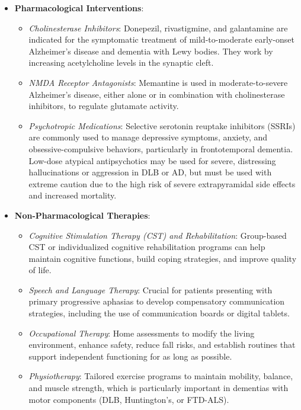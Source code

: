 \begin{itemize}
    \item \textbf{Pharmacological Interventions}:
    \begin{itemize}
        \item \textit{Cholinesterase Inhibitors}: Donepezil, rivastigmine, and galantamine are indicated for the symptomatic treatment of mild-to-moderate early-onset Alzheimer's disease and dementia with Lewy bodies. They work by increasing acetylcholine levels in the synaptic cleft.
        \item \textit{NMDA Receptor Antagonists}: Memantine is used in moderate-to-severe Alzheimer's disease, either alone or in combination with cholinesterase inhibitors, to regulate glutamate activity.
        \item \textit{Psychotropic Medications}: Selective serotonin reuptake inhibitors (SSRIs) are commonly used to manage depressive symptoms, anxiety, and obsessive-compulsive behaviors, particularly in frontotemporal dementia. Low-dose atypical antipsychotics may be used for severe, distressing hallucinations or aggression in DLB or AD, but must be used with extreme caution due to the high risk of severe extrapyramidal side effects and increased mortality.
    \end{itemize}
    \item \textbf{Non-Pharmacological Therapies}:
    \begin{itemize}
        \item \textit{Cognitive Stimulation Therapy (CST) and Rehabilitation}: Group-based CST or individualized cognitive rehabilitation programs can help maintain cognitive functions, build coping strategies, and improve quality of life.
        \item \textit{Speech and Language Therapy}: Crucial for patients presenting with primary progressive aphasias to develop compensatory communication strategies, including the use of communication boards or digital tablets.
        \item \textit{Occupational Therapy}: Home assessments to modify the living environment, enhance safety, reduce fall risks, and establish routines that support independent functioning for as long as possible.
        \item \textit{Physiotherapy}: Tailored exercise programs to maintain mobility, balance, and muscle strength, which is particularly important in dementias with motor components (DLB, Huntington's, or FTD-ALS).
    \end{itemize}

\end{itemize}
